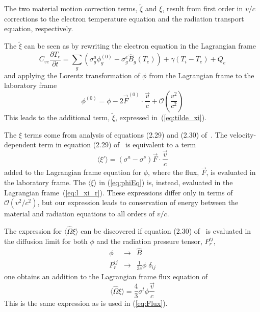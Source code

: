\documentclass{article}
\newcommand{\partl}[2]{\ensuremath{\frac{\partial{#1}}{\partial{#2}}}}\newcommand{\del}{\ensuremath{\vec{\nabla}}}
\newcommand{\Bg}{\ensuremath{\hat{B}_{g}}}
\begin{document}
The two material motion correction terms, $\tilde{\xi}$ and $\xi$, result
from first order in $v/c$ corrections to the electron temperature equation
and the radiation transport equation, respectively.

The $\tilde{\xi}$ can be seen as by rewriting the electron equation in
the Lagrangian frame
\begin{equation}
	C_{ve} \partl{T_{e}}{t} = 
		\sum_{g} \left(
			\sigma_{g}^{a} \phi^{(0)}_{g}
			- \sigma_{g}^{e} \Bg(T_{e}) \right)
			+ \gamma (T_{i} - T_{e}) + Q_{e}
\end{equation}
and applying the Lorentz transformation of $\phi$ from the Lagrangian frame
to the laboratory frame~\cite[page 417]{MihalasMihalas}
\begin{equation}
	\phi^{(0)} = \phi - 2 \vec{F}^{(0)} \cdot \frac{\vec{v}}{c} 
		 + \mathcal{O}(\frac{v^2}{c^2})
\end{equation}
This leads to the additional term, $\tilde{\xi}$,
expressed in~(\ref{eq:tilde_xi}).

The $\xi$ terms come from analysis of equations (2.29) and (2.30)
of~\cite{MihalasKlein}.
The velocity-dependent term in equation (2.29) of~\cite{MihalasKlein}
is equivalent to a term
\begin{equation}
	\langle \xi' \rangle = (\sigma^{a} - \sigma^{s}) \vec{F}
			\cdot \frac{\vec{v}}{c}
\end{equation}
added to the Lagrangian frame equation for $\phi$,
where the flux, $\vec{F}$, is evaluated in the laboratory frame.
The $\langle \xi \rangle$ in (\ref{eq:phiEq}) is, instead, evaluated in the
Lagrangian frame~(\ref{eq:l_xi_r}).
These expressions differ only in terms of $\mathcal{O}(v^2/c^2)$,
but our expression
leads to conservation of energy between the material and radiation equations
to all orders of $v/c$.

The expression for $\langle \hat{\Omega} \xi \rangle$ can be discovered
if equation (2.30) of~\cite{MihalasKlein} is evaluated in the diffusion limit
for both $\phi$ and the radiation pressure tensor, $P_{r}^{ij}$,
\begin{eqnarray}
	\phi &\rightarrow& \hat{B} \\
	P_{r}^{ij} &\rightarrow& \frac{1}{3c} \phi \; \delta_{ij} 
\end{eqnarray}
one obtains an addition to the Lagrangian frame flux equation of
\begin{equation}
	\langle \hat{\Omega} \xi \rangle = 
		\frac{4}{3} \sigma^{t} \phi \frac{\vec{v}}{c}
\end{equation}
This is the same expression as is used in (\ref{eq:Flux}).
\end{document}
